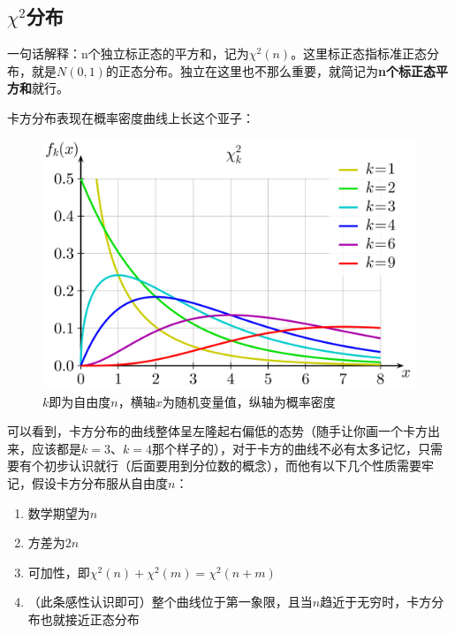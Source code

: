 \documentclass[10pt, a4paper]{article}
\begin{document}
\subsection{$\chi^2$分布}
一句话解释：n个独立标正态的平方和，记为$\chi^2(n)$。这里标正态指标准正态分布，就是$N(0,1)$的正态分布。独立在这里也不那么重要，就简记为\textbf{n个标正态平方和}就行。\par
卡方分布表现在概率密度曲线上长这个亚子：

\begin{figure}[H]
    \centering
    \includegraphics[width=0.5\linewidth]{Chi.png}
    \caption{$k$即为自由度$n$，横轴$x$为随机变量值，纵轴为概率密度}
    \label{fig:Chi}
\end{figure}
可以看到，卡方分布的曲线整体呈左隆起右偏低的态势（随手让你画一个卡方出来，应该都是$k=3$、$k=4$那个样子的），对于卡方的曲线不必有太多记忆，只需要有个初步认识就行（后面要用到分位数的概念），而他有以下几个性质需要牢记，假设卡方分布服从自由度$n$：
\begin{enumerate}
    \item 数学期望为$n$
    \item 方差为$2n$
    \item 可加性，即$\chi^{2}(n)+\chi^{2}(m)=\chi^{2}(n+m)$
    \item （此条感性认识即可）整个曲线位于第一象限，且当$n$趋近于无穷时，卡方分布也就接近正态分布
\end{enumerate}
\end{document}
